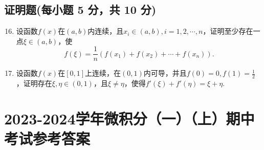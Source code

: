 \documentclass[../Main.tex]{subfiles}
\begin{document}
\section{证明题(每小题 5 分，共 10 分)}
\begin{enumerate}
    \setcounter{enumi}{15}
    \item 设函数$f(x)$在$(a,b)$内连续，且$x_{i}\in(a,b),i=1,2,\cdots,n$，证明至少存在一点$\xi
              \in(a,b)$，使
          \[
              f(\xi)=\frac{1}{n}\left(f(x_{1})+f(x_{2})+\cdots+f(x_{n})\right).
          \]
          \vspace{10em}

    \item 设函数$f(x)$在$[0,1]$上连续，在$(0,1)$内可导，并且$f(0)=0,f(1)=\frac{1}{2}$，证明存在$\xi
              ,\eta\in(0,1)$，且$\xi\neq\eta$，使得$f'(\xi)+f'(\eta)=\xi+\eta$.
          \vspace{8em}
\end{enumerate}

\chapter{2023-2024学年微积分（一）（上）期中考试参考答案}
\end{document}
